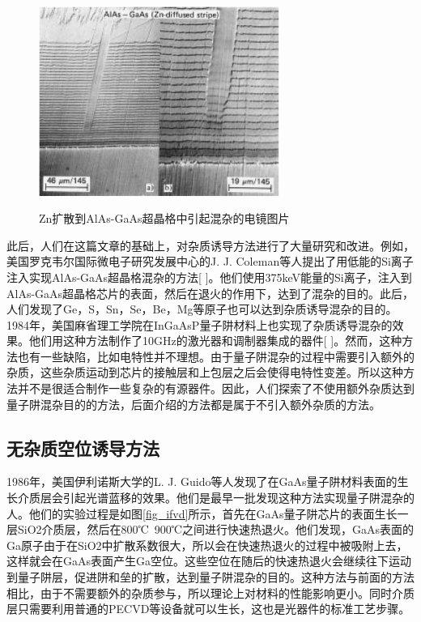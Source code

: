 \documentclass{ZJUthesis}
\begin{document}
\begin{figure}[!ht]
  \centering
  \includegraphics[width=0.7\textwidth]{./Pictures/iid.eps}\\
  \caption{Zn扩散到AlAs-GaAs超晶格中引起混杂的电镜图片}
  \label{fig_iid}
\end{figure}

此后，人们在这篇文章的基础上，对杂质诱导方法进行了大量研究和改进。例如，美国罗克韦尔国际微电子研究发展中心的J. J. Coleman等人提出了用低能的Si离子注入实现AlAs-GaAs超晶格混杂的方法[ ]。他们使用375keV能量的Si离子，注入到AlAs-GaAs超晶格芯片的表面，然后在退火的作用下，达到了混杂的目的。此后，人们发现了Ge，S，Sn，Se，Be，Mg等原子也可以达到杂质诱导混杂的目的。1984年，美国麻省理工学院在InGaAsP量子阱材料上也实现了杂质诱导混杂的效果。他们用这种方法制作了10GHz的激光器和调制器集成的器件[ ]。然而，这种方法也有一些缺陷，比如电特性并不理想。由于量子阱混杂的过程中需要引入额外的杂质，这些杂质运动到芯片的接触层和上包层之后会使得电特性变差。所以这种方法并不是很适合制作一些复杂的有源器件。因此，人们探索了不使用额外杂质达到量子阱混杂目的的方法，后面介绍的方法都是属于不引入额外杂质的方法。

\subsection{无杂质空位诱导方法}

1986年，美国伊利诺斯大学的L. J. Guido等人发现了在GaAs量子阱材料表面的生长介质层会引起光谱蓝移的效果。他们是最早一批发现这种方法实现量子阱混杂的人。他们的实验过程是如图\ref{fig_ifvd}所示，首先在GaAs量子阱芯片的表面生长一层SiO2介质层，然后在800℃~900℃之间进行快速热退火。他们发现，GaAs表面的Ga原子由于在SiO2中扩散系数很大，所以会在快速热退火的过程中被吸附上去，这样就会在GaAs表面产生Ga空位。这些空位在随后的快速热退火会继续往下运动到量子阱层，促进阱和垒的扩散，达到量子阱混杂的目的。这种方法与前面的方法相比，由于不需要额外的杂质参与，所以理论上对材料的性能影响更小。同时介质层只需要利用普通的PECVD等设备就可以生长，这也是光器件的标准工艺步骤。
\end{document}
